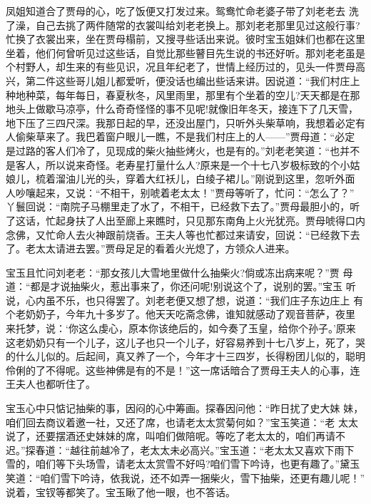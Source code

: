 凤姐知道合了贾母的心，吃了饭便又打发过来。鸳鸯忙命老婆子带了刘老老去
洗了澡，自己去挑了两件随常的衣裳叫给刘老老换上。那刘老老那里见过这般行事?
忙换了衣裳出来，坐在贾母榻前，又搜寻些话出来说。彼时宝玉姐妹们也都在这里
坐着，他们何曾听见过这些话，自觉比那些瞽目先生说的书还好听。那刘老老虽是
个村野人，却生来的有些见识，况且年纪老了，世情上经历过的，见头一件贾母高
兴，第二件这些哥儿姐儿都爱听，便没话也编出些话来讲。因说道：“我们村庄上
种地种菜，每年每日，春夏秋冬，风里雨里，那里有个坐着的空儿?天天都是在那
地头上做歇马凉亭，什么奇奇怪怪的事不见呢!就像旧年冬天，接连下了几天雪，
地下压了三四尺深。我那日起的早，还没出屋门，只听外头柴草响，我想着必定有
人偷柴草来了。我巴着窗户眼儿一瞧，不是我们村庄上的人——”贾母道：“必定
是过路的客人们冷了，见现成的柴火抽些烤火，也是有的。”刘老老笑道：“也并不
是客人，所以说来奇怪。老寿星打量什么人?原来是一个十七八岁极标致的个小姑
娘儿，梳着溜油儿光的头，穿着大红袄儿，白绫子裙儿。”刚说到这里，忽听外面
人吵嚷起来，又说：“不相干，别唬着老太太！”贾母等听了，忙问：“怎么了？”
丫鬟回说：“南院子马棚里走了水了，不相干，已经救下去了。”贾母最胆小的，听
了这话，忙起身扶了人出至廊上来瞧时，只见那东南角上火光犹亮。贾母唬得口内
念佛，又忙命人去火神跟前烧香。王夫人等也忙都过来请安，回说：“已经救下去
了。老太太请进去罢。”贾母足足的看着火光熄了，方领众人进来。

宝玉且忙问刘老老：“那女孩儿大雪地里做什么抽柴火?倘或冻出病来呢？”贾
母道：“都是才说抽柴火，惹出事来了，你还问呢!别说这个了，说别的罢。”宝玉
听说，心内虽不乐，也只得罢了。刘老老便又想了想，说道：“我们庄子东边庄上
有个老奶奶子，今年九十多岁了。他天天吃斋念佛，谁知就感动了观音菩萨，夜里
来托梦，说：‘你这么虔心，原本你该绝后的，如今奏了玉皇，给你个孙子。’原来
这老奶奶只有一个儿子，这儿子也只一个儿子，好容易养到十七八岁上，死了，哭
的什么儿似的。后起间，真又养了一个，今年才十三四岁，长得粉团儿似的，聪明
伶俐的了不得呢。这些神佛是有的不是！”这一席话暗合了贾母王夫人的心事，连
王夫人也都听住了。

宝玉心中只惦记抽柴的事，因闷的心中筹画。探春因问他：“昨日扰了史大妹
妹，咱们回去商议着邀一社，又还了席，也请老太太赏菊何如？”宝玉笑道：“老
太太说了，还要摆酒还史妹妹的席，叫咱们做陪呢。等吃了老太太的，咱们再请不
迟。”探春道：“越往前越冷了，老太太未必高兴。”宝玉道：“老太太又喜欢下雨下
雪的，咱们等下头场雪，请老太太赏雪不好吗?咱们雪下吟诗，也更有趣了。”黛玉
笑道：“咱们雪下吟诗，依我说，还不如弄一捆柴火，雪下抽柴，还更有趣儿呢！”
说着，宝钗等都笑了。宝玉瞅了他一眼，也不答话。

